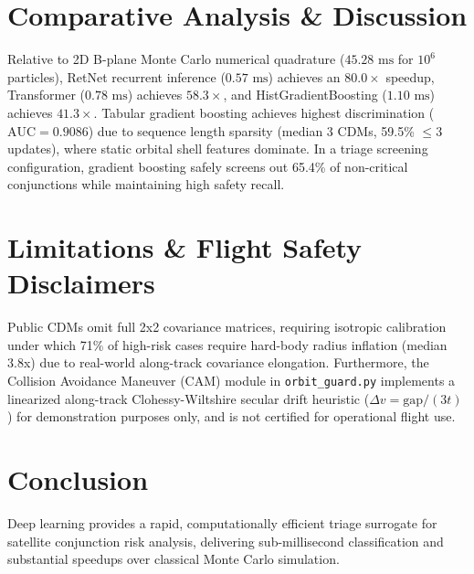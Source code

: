 \documentclass[conference]{IEEEtran}
\begin{document}
\section{Comparative Analysis \& Discussion}
Relative to 2D B-plane Monte Carlo numerical quadrature ($45.28\text{ ms}$ for $10^6$ particles), RetNet recurrent inference ($0.57\text{ ms}$) achieves an $80.0\times$ speedup, Transformer ($0.78\text{ ms}$) achieves $58.3\times$, and HistGradientBoosting ($1.10\text{ ms}$) achieves $41.3\times$. Tabular gradient boosting achieves highest discrimination ($\text{AUC} = 0.9086$) due to sequence length sparsity (median 3 CDMs, 59.5\% $\le 3$ updates), where static orbital shell features dominate. In a triage screening configuration, gradient boosting safely screens out 65.4\% of non-critical conjunctions while maintaining high safety recall.

\section{Limitations \& Flight Safety Disclaimers}
Public CDMs omit full 2x2 covariance matrices, requiring isotropic calibration under which 71\% of high-risk cases require hard-body radius inflation (median 3.8x) due to real-world along-track covariance elongation. Furthermore, the Collision Avoidance Maneuver (CAM) module in \texttt{orbit\_guard.py} implements a linearized along-track Clohessy-Wiltshire secular drift heuristic ($\Delta v = \text{gap} / (3 t)$) for demonstration purposes only, and is not certified for operational flight use.

\section{Conclusion}
Deep learning provides a rapid, computationally efficient triage surrogate for satellite conjunction risk analysis, delivering sub-millisecond classification and substantial speedups over classical Monte Carlo simulation.
\end{document}
